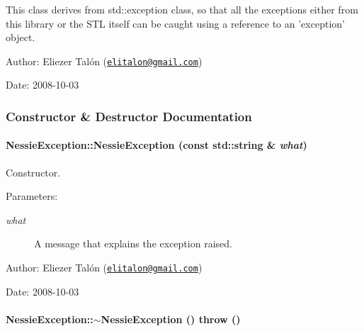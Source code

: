 This class derives from std::exception class, so that all the exceptions either from this library or the STL itself can be caught using a reference to an 'exception' object.

\begin{Desc}
\item[Author:]Eliezer Talón (\href{mailto:elitalon@gmail.com}{\tt elitalon@gmail.com}) \end{Desc}
\begin{Desc}
\item[Date:]2008-10-03 \end{Desc}


\subsubsection{Constructor \& Destructor Documentation}
\hypertarget{class_nessie_exception_80c86c892438045635bf6a99da17e859}{
\paragraph[{NessieException}]{\setlength{\rightskip}{0pt plus 5cm}NessieException::NessieException (const std::string \& {\em what})}\hfill}
\label{class_nessie_exception_80c86c892438045635bf6a99da17e859}


Constructor. 

\begin{Desc}
\item[Parameters:]
\begin{description}
\item[{\em what}]A message that explains the exception raised.\end{description}
\end{Desc}
\begin{Desc}
\item[Author:]Eliezer Talón (\href{mailto:elitalon@gmail.com}{\tt elitalon@gmail.com}) \end{Desc}
\begin{Desc}
\item[Date:]2008-10-03 \end{Desc}
\hypertarget{class_nessie_exception_19f44d2725dd53e2f10505a88e5773f2}{
\paragraph[{$\sim$NessieException}]{\setlength{\rightskip}{0pt plus 5cm}NessieException::$\sim$NessieException ()  throw ()}\hfill}
\label{class_nessie_exception_19f44d2725dd53e2f10505a88e5773f2}


